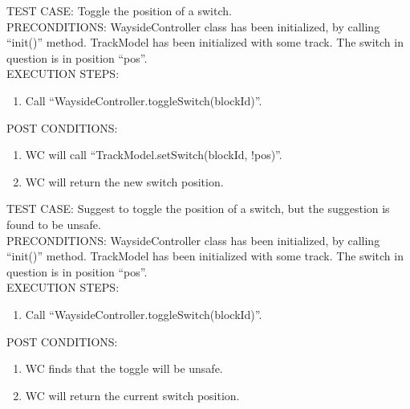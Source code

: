 \documentclass{scrreprt}
\begin{document}
        TEST CASE: Toggle the position of a switch.\\
        PRECONDITIONS: WaysideController class has been initialized, by calling ``init()'' method.
        TrackModel has been initialized with some track.
        The switch in question is in position ``pos''.\\
        EXECUTION STEPS: \begin{enumerate}
            \item Call ``WaysideController.toggleSwitch(blockId)''.
        \end{enumerate}
        POST CONDITIONS: \begin{enumerate}
            \item WC will call ``TrackModel.setSwitch(blockId, !pos)''.
            \item WC will return the new switch position.
        \end{enumerate}

        TEST CASE: Suggest to toggle the position of a switch, but the suggestion is found to be unsafe.\\
        PRECONDITIONS: WaysideController class has been initialized, by calling ``init()'' method.
        TrackModel has been initialized with some track.
        The switch in question is in position ``pos''.\\
        EXECUTION STEPS: \begin{enumerate}
            \item Call ``WaysideController.toggleSwitch(blockId)''.
        \end{enumerate}
        POST CONDITIONS: \begin{enumerate}
            \item WC finds that the toggle will be unsafe.
            \item WC will return the current switch position.
        \end{enumerate}
\end{document}
